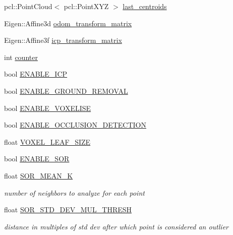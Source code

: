 \begin{DoxyCompactItemize}
\item 
pcl\+::\+Point\+Cloud$<$ pcl\+::\+Point\+X\+YZ $>$ \hyperlink{classdatmo_1_1cloud__segmentation_a576b87bb01fef0d14ba862f08ca8e2ba}{last\+\_\+centroids}
\item 
Eigen\+::\+Affine3d \hyperlink{classdatmo_1_1cloud__segmentation_a9f47c2e7cba42121779e2772a052f58b}{odom\+\_\+transform\+\_\+matrix}
\item 
Eigen\+::\+Affine3f \hyperlink{classdatmo_1_1cloud__segmentation_ac7762960a72df80afdf8bedd59335ddc}{icp\+\_\+transform\+\_\+matrix}
\item 
int \hyperlink{classdatmo_1_1cloud__segmentation_a56499171fe846acfb2a73a5134261a91}{counter}
\item 
bool \hyperlink{classdatmo_1_1cloud__segmentation_a71c4d63aacea33f4c1b172e1ff723163}{E\+N\+A\+B\+L\+E\+\_\+\+I\+CP}
\item 
bool \hyperlink{classdatmo_1_1cloud__segmentation_a03474f362047eb23fbcc53e5ce943148}{E\+N\+A\+B\+L\+E\+\_\+\+G\+R\+O\+U\+N\+D\+\_\+\+R\+E\+M\+O\+V\+AL}
\item 
bool \hyperlink{classdatmo_1_1cloud__segmentation_aa3af9f5d3b0072cba61c14cff25965cb}{E\+N\+A\+B\+L\+E\+\_\+\+V\+O\+X\+E\+L\+I\+SE}
\item 
bool \hyperlink{classdatmo_1_1cloud__segmentation_a5f7ffa75c60af605cc914de7296cddb1}{E\+N\+A\+B\+L\+E\+\_\+\+O\+C\+C\+L\+U\+S\+I\+O\+N\+\_\+\+D\+E\+T\+E\+C\+T\+I\+ON}
\item 
float \hyperlink{classdatmo_1_1cloud__segmentation_af6f1f8553f2a18176ae84b78ddea07c9}{V\+O\+X\+E\+L\+\_\+\+L\+E\+A\+F\+\_\+\+S\+I\+ZE}
\item 
bool \hyperlink{classdatmo_1_1cloud__segmentation_ae54c11225658974ed8a37a03815aab0e}{E\+N\+A\+B\+L\+E\+\_\+\+S\+OR}
\item 
float \hyperlink{classdatmo_1_1cloud__segmentation_abb5b1262c14e68886e01e0230c530b07}{S\+O\+R\+\_\+\+M\+E\+A\+N\+\_\+K}
\begin{DoxyCompactList}\small\item\em number of neighbors to analyze for each point \end{DoxyCompactList}\item 
float \hyperlink{classdatmo_1_1cloud__segmentation_ae1c32b9f5741dd7d212f2745f8784de0}{S\+O\+R\+\_\+\+S\+T\+D\+\_\+\+D\+E\+V\+\_\+\+M\+U\+L\+\_\+\+T\+H\+R\+E\+SH}
\begin{DoxyCompactList}\small\item\em distance in multiples of std dev after which point is considered an outlier \end{DoxyCompactList}\item 

\end{DoxyCompactItemize}
